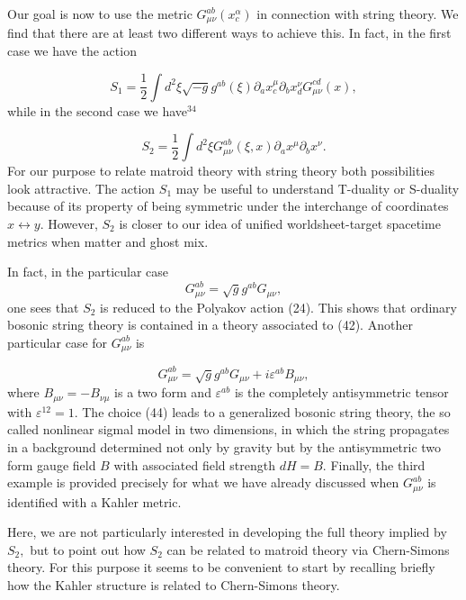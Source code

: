 \documentclass[a4paper,12pt]{article}
\begin{document}
Our goal is now to use the metric $G_{\mu \nu }^{ab}(x_{c}^{\alpha })$ in
connection with string theory. We find that there are at least two different
ways to achieve this. In fact, in the first case we have the action

\begin{equation}
S_{1}=\frac{1}{2}\int d^{2}\xi \sqrt{-g}g^{ab}(\xi )\partial _{a}x_{c}^{\mu
}\partial _{b}x_{d}^{\nu }G_{\mu \nu }^{cd}(x),  \label{41}
\end{equation}
while in the second case we have$^{34}$

\begin{equation}
S_{2}=\frac{1}{2}\int d^{2}\xi G_{\mu \nu }^{ab}(\xi ,x)\partial _{a}x^{\mu
}\partial _{b}x^{\nu }.  \label{42}
\end{equation}
For our purpose to relate matroid theory with string theory both
possibilities look attractive. The action $S_{1}$ may be useful to
understand T-duality or S-duality because of its property of being symmetric
under the interchange of coordinates $x\leftrightarrow y.$ However, $S_{2}$
is closer to our idea of unified worldsheet-target spacetime metrics when
matter and ghost mix.

In fact, in the particular case 
\begin{equation}
G_{\mu \nu }^{ab}=\sqrt{g}g^{ab}G_{\mu \nu },  \label{43}
\end{equation}
one sees that $S_{2}$ is reduced to the Polyakov action (24). This shows
that ordinary bosonic string theory is contained in a theory associated to
(42). Another particular case for $G_{\mu \nu }^{ab}$ is

\begin{equation}
G_{\mu \nu }^{ab}=\sqrt{g}g^{ab}G_{\mu \nu }+i\varepsilon ^{ab}B_{\mu \nu },
\label{44}
\end{equation}
where $B_{\mu \nu }=-B_{\nu \mu }$ is a two form and $\varepsilon ^{ab}$ is
the completely antisymmetric tensor with $\varepsilon ^{12}=1.$ The choice
(44) leads to a generalized bosonic string theory, the so called nonlinear
sigmal model in two dimensions, in which the string propagates in a
background determined not only by gravity but by the antisymmetric two form
gauge field $B$ with associated field strength $dH=B.$ Finally, the third
example is provided precisely for what we have already discussed when $%
G_{\mu \nu }^{ab}$ is identified with a Kahler metric.

Here, we are not particularly interested in developing the full theory
implied by $S_{2},$ but to point out how $S_{2}$ can be related to matroid
theory via Chern-Simons theory. For this purpose it seems to be convenient
to start by recalling briefly how the Kahler structure is related to
Chern-Simons theory.
\end{document}
